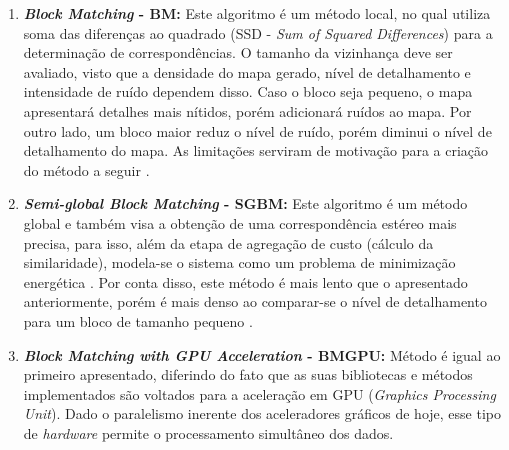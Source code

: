 \begin{enumerate}
 \item \textbf{\textit{Block Matching} - BM:} Este algoritmo é um método local, no qual utiliza soma das diferenças ao quadrado (SSD - \textit{Sum of Squared Differences}) para a determinação de correspondências. O tamanho da vizinhança deve ser avaliado, visto que a densidade do mapa gerado, nível de detalhamento e intensidade de ruído dependem disso. Caso o bloco seja pequeno, o mapa apresentará detalhes mais nítidos, porém adicionará ruídos ao mapa. Por outro lado, um bloco maior reduz o nível de ruído, porém diminui o nível de detalhamento do mapa. As limitações serviram de motivação para a criação do método a seguir \cite{Hirschmuller2008}.   
 
 \item \textbf{\textit{Semi-global Block Matching} - SGBM:} Este algoritmo é um método global e também visa a obtenção de uma correspondência estéreo mais precisa, para isso, além da etapa de agregação de custo (cálculo da similaridade), modela-se o sistema como um problema de minimização energética \cite{JunhwanKim2003}. Por conta disso, este método é mais lento que o apresentado anteriormente, porém é mais denso ao comparar-se o nível de detalhamento para um bloco de tamanho pequeno \cite{Hirschmuller2008}.
 
 \item \textbf{\textit{Block Matching with GPU Acceleration} - BMGPU:} Método é igual ao primeiro apresentado, diferindo do fato que as suas bibliotecas e métodos implementados são voltados para a aceleração em GPU (\textit{Graphics Processing Unit}). Dado o paralelismo inerente dos aceleradores gráficos de hoje, esse tipo de \textit{hardware} permite o processamento simultâneo dos dados. 
 \end{enumerate}






